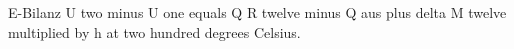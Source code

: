 E-Bilanz  
U two minus U one equals Q R twelve minus Q aus plus delta M twelve multiplied by h at two hundred degrees Celsius.